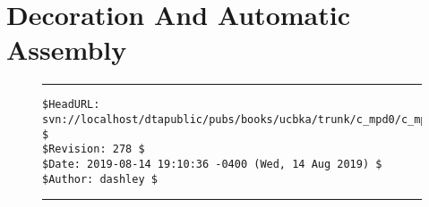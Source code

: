 \section{Decoration And Automatic Assembly}


\vfill
\noindent\begin{figure}[!b]
\noindent\rule[-0.25in]{\textwidth}{1pt}
\begin{tiny}
\begin{verbatim}
$HeadURL: svn://localhost/dtapublic/pubs/books/ucbka/trunk/c_mpd0/c_mpd0.tex $
$Revision: 278 $
$Date: 2019-08-14 19:10:36 -0400 (Wed, 14 Aug 2019) $
$Author: dashley $
\end{verbatim}
\end{tiny}
\noindent\rule[0.25in]{\textwidth}{1pt}
\end{figure}

%

